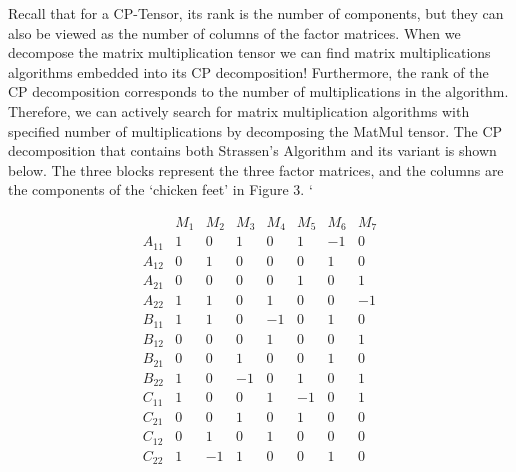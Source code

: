 \documentclass[MS]{wfuthesis}
\begin{document}
                    Recall that for a CP-Tensor, its rank is the number of components, but they can also be viewed as the number of columns of the factor matrices. When we decompose the matrix multiplication tensor we can find matrix multiplications algorithms embedded into its CP decomposition! Furthermore, the rank of the CP decomposition corresponds to the number of multiplications in the algorithm. Therefore, we can actively search for matrix multiplication algorithms with specified number of multiplications by decomposing the MatMul tensor. The CP decomposition that contains both Strassen's Algorithm and its variant is shown below. The three blocks represent the three factor matrices, and the columns are the components of the `chicken feet' in Figure 3.
        `           
                    \newpage
                    \begin{multicols}{2}
                        \[\begin{array}{c|ccccccc}
                                & M_1 & M_2 & M_3 & M_4 & M_5 & M_6 & M_7 \\
                                \hline
                                A_{11} & 1 & 0 & 1 & 0 & 1 & -1 & 0 \\
                                A_{12} & 0 & 1 & 0 & 0 & 0 & 1 & 0 \\
                                A_{21} & 0 & 0 & 0 & 0 & 1 & 0 & 1 \\
                                A_{22} & 1 & 1 & 0 & 1 & 0 & 0 & -1 \\
                                \hline
                                B_{11} & 1 & 1 & 0 & -1 & 0 & 1 & 0 \\
                                B_{12} & 0 & 0 & 0 & 1 & 0 & 0 & 1 \\
                                B_{21} & 0 & 0 & 1 & 0 & 0 & 1 & 0 \\
                                B_{22} & 1 & 0 & -1 & 0 & 1 & 0 & 1 \\
                                \hline
                                C_{11} & 1 & 0 & 0 & 1 & -1 & 0 & 1 \\
                                C_{21} & 0 & 0 & 1 & 0 & 1 & 0 & 0 \\
                                C_{12} & 0 & 1 & 0 & 1 & 0 & 0 & 0 \\
                                C_{22} & 1 & -1 & 1 & 0 & 0 & 1 & 0 \\
                        \end{array}\]
                    

\end{multicols}
\end{document}

